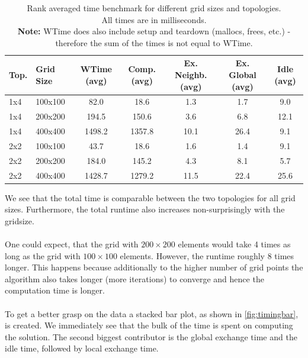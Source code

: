 \begin{table}[H]
    \centering
    \caption{Rank averaged time benchmark for different grid sizes and topologies.\\ All times are in milliseconds.\\\textbf{Note:} WTime does also include setup and teardown (mallocs, frees, etc.) - therefore the sum of the times is not equal to WTime.}
    \label{tab:timing}
    \begin{tabular}{|l|l|S[table-format=4.1]|S[table-format=4.1]|S[table-format=2.1]|S[table-format=2.1]|S[table-format=2.1]|}
        \hline
        Top. & {{{Grid Size}}} & {{{WTime (avg)}}} & {{{Comp. (avg)}}} & {{{Ex. Neighb. (avg)}}} & {{{Ex. Global (avg)}}} & {{{Idle (avg)}}} \\\hline
        1x4 & 100x100 & 82.0 & 18.6 & 1.3 & 1.7 & 9.0 \\\hline
        1x4 & 200x200 & 194.5 & 150.6 & 3.6 & 6.8 & 12.1 \\\hline
        1x4 & 400x400 & 1498.2 & 1357.8 & 10.1 & 26.4 & 9.1 \\\hline
        2x2 & 100x100 & 43.7 & 18.6 & 1.6 & 1.4 & 9.1 \\\hline
        2x2 & 200x200 & 184.0 & 145.2 & 4.3 & 8.1 & 5.7 \\\hline
        2x2 & 400x400 & 1428.7 & 1279.2 & 11.5 & 22.4 & 25.6 \\\hline
    \end{tabular}
\end{table}
We see that the total time is comparable between the two topologies for all grid sizes. Furthermore, the total runtime also increases non-surprisingly with the gridsize. \\
\\
One could expect, that the grid with $200\times200$ elements would take 4 times as long as the grid with $100\times100$ elements. However, the runtime roughly 8 times longer. This happens because additionally to the higher number of grid points the algorithm also takes longer (more iterations) to converge and hence the computation time is longer. \\
\\
To get a better grasp on the data a stacked bar plot, as shown in \autoref{fig:timingbar}, is created. We immediately see that the bulk of the time is spent on computing the solution. The second biggest contributor is the global exchange time and the idle time, followed by local exchange time.\\
